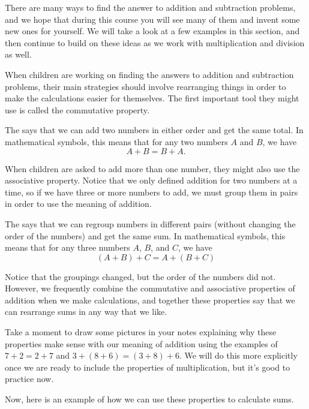 \documentclass{ximera}
\begin{document}
There are many ways to find the answer to addition and subtraction problems, and we hope that during this course you will see many of them and invent some new ones for yourself. We will take a look at a few examples in this section, and then continue to build on these ideas as we work with multiplication and division as well. 

When children are working on finding the answers to addition and subtraction problems, their main strategies should involve rearranging things in order to make the calculations easier for themselves. The first important tool they might use is called the commutative property.

\begin{definition}
The  says that we can add two numbers in either order and get the same total. In mathematical symbols, this means that for any two numbers $A$ and $B$, we have
\[
A + B = B + A.
\]
\end{definition}

When children are asked to add more than one number, they might also use the associative property. Notice that we only defined addition for two numbers at a time, so if we have three or more numbers to add, we must group them in pairs in order to use the meaning of addition.
\begin{definition}
The  says that we can regroup numbers in different pairs (without changing the order of the numbers) and get the same sum. In mathematical symbols, this means that for any three numbers $A$, $B$, and $C$, we have
\[
(A + B) + C = A + (B+C)
\]
\end{definition}
Notice that the groupings changed, but the order of the numbers did not. However, we frequently combine the commutative and associative properties of addition when we make calculations, and together these properties say that we can rearrange sums in any way that we like.

Take a moment to draw some pictures in your notes explaining why these properties make sense with our meaning of addition using the examples of $7+2 = 2+7$ and $3+(8+6) = (3+8)+6$. We will do this more explicitly once we are ready to include the properties of multiplication, but it's good to practice now.

Now, here is an example of how we can use these properties to calculate sums.
\end{document}
